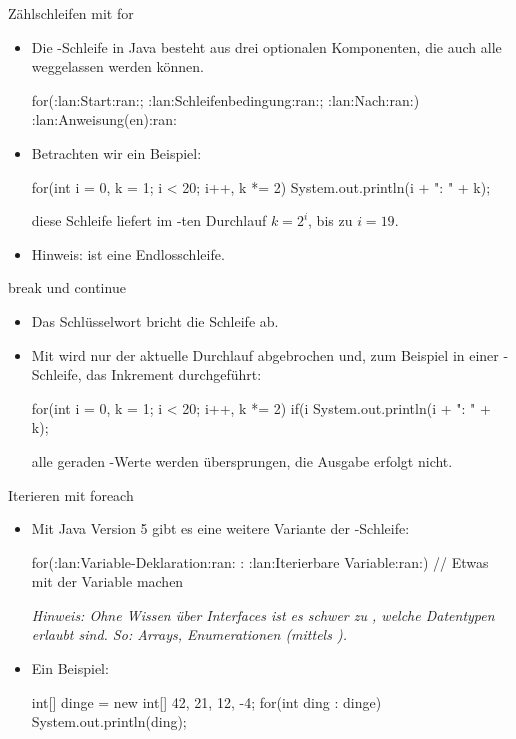 \begin{frame}[fragile]{Zählschleifen mit for}
    \begin{itemize}[<+(1)->]
        \widei
        \item Die -Schleife in Java besteht aus drei optionalen Komponenten,\pause{} die auch alle weggelassen werden können.
        \begin{plainjava}
for(:lan:Start:ran:; :lan:Schleifenbedingung:ran:; :lan:Nach:ran:) {
    :lan:Anweisung(en):ran:
}
        \end{plainjava}
        \item Betrachten wir ein Beispiel:\pause{}
\begin{plainjava}
for(int i = 0, k = 1; i < 20; i++, k *= 2)
    System.out.println(i + ": " + k);
\end{plainjava}
    \pause{}diese Schleife liefert im -ten Durchlauf \(k = 2^i\),\pause{} bis zu \(i = 19\).
        \item Hinweis:  ist eine Endlosschleife.
    \end{itemize}
\end{frame}

\begin{frame}[fragile]{break und continue}
    \begin{itemize}[<+(1)->]
        \widei
        \item Das Schlüsselwort  bricht die  Schleife ab.
        \item Mit  wird nur der aktuelle Durchlauf abgebrochen und,\pause{} zum Beispiel in einer -Schleife,\pause{} das Inkrement durchgeführt:\pause{}
\begin{plainjava}
for(int i = 0, k = 1; i < 20; i++, k *= 2) {
    if(i %
    System.out.println(i + ": " + k);
}
\end{plainjava}
        \pause{}alle geraden -Werte werden übersprungen, die Ausgabe erfolgt nicht.
    \end{itemize}
\end{frame}

\begin{frame}[fragile]{Iterieren mit foreach}
    \begin{itemize}[<+(1)->]
        \widei
        \item Mit Java Version 5 gibt es eine weitere Variante der -Schleife:\pause{}
\begin{plainjava}
for(:lan:Variable-Deklaration:ran: : :lan:Iterierbare Variable:ran:) {
    // Etwas mit der Variable machen
}
\end{plainjava}
        \pause{}\textit{Hinweis: Ohne Wissen über Interfaces ist es schwer zu , welche Datentypen erlaubt sind.\pause{} So: Arrays, Enumerationen (mittels ).}
        \item Ein Beispiel:\pause{}
\begin{plainjava}
int[] dinge = new int[] {42, 21, 12, -4};
for(int ding : dinge){
    System.out.println(ding);
}
\end{plainjava}
    \end{itemize}
\end{frame}

